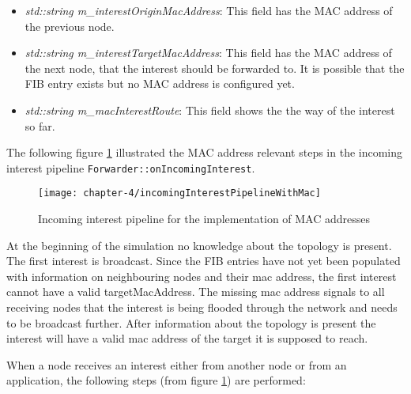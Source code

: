 \begin{itemize}
\item \emph{std::string m\_interestOriginMacAddress}: This field has the MAC address of the previous node.
\item \emph{std::string m\_interestTargetMacAddress}: This field has the MAC address of the next node, that the interest should be forwarded to. It is possible that the FIB entry exists but no MAC address is configured yet.
\item \emph{std::string m\_macInterestRoute}: This field shows the the way of the interest so far.
\end{itemize}

The following figure \ref{fig:incomingInterestPipelineWithMac} illustrated the MAC address relevant steps in the incoming interest pipeline \texttt{Forwarder::onIncomingInterest}.

\begin{figure}[H]
  \centering
  \texttt{[image: chapter-4/incomingInterestPipelineWithMac]}
  \caption{Incoming interest pipeline for the implementation of MAC addresses}
  \label{fig:incomingInterestPipelineWithMac}
\end{figure}

At the beginning of the simulation no knowledge about the topology is present. The first interest is broadcast. Since the FIB entries have not yet been populated with information on neighbouring nodes and their mac address, the first interest cannot have a valid targetMacAddress. The missing mac address signals to all receiving nodes that the interest is being flooded through the network and needs to be broadcast further. After information about the topology is present the interest will have a valid mac address of the target it is supposed to reach.

When a node receives an interest either from another node or from an application, the following steps (from figure \ref{fig:incomingInterestPipelineWithMac}) are performed:

